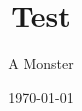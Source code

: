 \documentclass{beamer}
\title{Test}
\author{A Monster}
\institute{In A Cave}
\date{\today}
\begin{document}
\begin{frame}
\titlepage
\end{frame}
\end{document}
